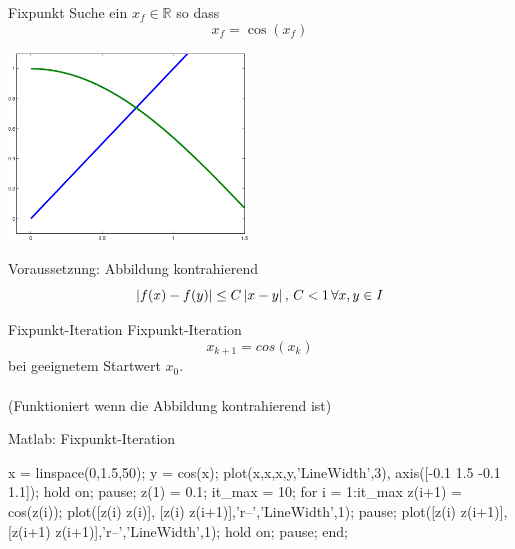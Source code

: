 \documentclass[hyperref={xetex}]{beamer}
\begin{document}
%
%
\begin{frame}[fragile]{Fixpunkt}
Suche ein $x_f \in \mathbb{R}$ so dass
\[ x_f = \cos (x_f ) \]
\begin{center}
\includegraphics[height=5cm]{figures/fixpunkt}
\end{center}
Voraussetzung: Abbildung kontrahierend 
\[
\left\lvert f(x)-f(y)\right\rvert \leq C \left\lvert x-y\right\rvert,\, C < 1\,  \forall  x,y \in  I
\]

\end{frame}
%
%
\begin{frame}[fragile]{Fixpunkt-Iteration}
Fixpunkt-Iteration 
\[ x_{k+1}=cos(x_k) \]
bei geeignetem Startwert $x_0$.  \\
\\
(Funktioniert wenn die Abbildung kontrahierend ist)
\end{frame}

%
%
\begin{frame}[fragile]{Matlab: Fixpunkt-Iteration}
\begin{matlabin}
x = linspace(0,1.5,50);
y = cos(x);
plot(x,x,x,y,'LineWidth',3),
axis([-0.1 1.5 -0.1 1.1]);
hold on;
pause; %
z(1) = 0.1; %
it_max = 10; %
for i = 1:it_max
    z(i+1) = cos(z(i));
    plot([z(i) z(i)], [z(i) z(i+1)],'r--','LineWidth',1);
    pause;
    plot([z(i) z(i+1)],[z(i+1) z(i+1)],'r--','LineWidth',1);
    hold on;
    pause; %
end;
\end{matlabin}
\end{frame}
\end{document}
